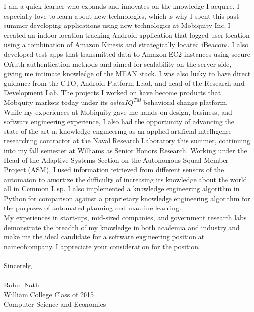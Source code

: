\documentclass[11pt]{letter} %
\newcommand{\forceindent}{\leavevmode{\parindent=24pt\indent}}
\begin{document}
\forceindent I am a quick learner who expands and innovates on the knowledge I acquire. I especially love to learn about new technologies, which is why I spent this past summer developing applications using new technologies at Mobiquity Inc. I created an indoor location tracking Android application that logged user location using a combination of Amazon Kinesis and strategically located iBeacons. I also developed test apps that transmitted data to Amazon EC2 instances using secure OAuth authentication methods and aimed for scalability on the server side, giving me intimate knowledge of the MEAN stack. I was also lucky to have direct guidance from the CTO, Android Platform Lead, and head of the Research and Development Lab. The projects I worked on have become products that Mobquity markets today under its $deltaIQ^{TM}$ behavioral change platform. \\

\forceindent While my experiences at Mobiquity gave me hands-on design, business, and software engineering experience, I also had the opportunity of advancing the state-of-the-art in knowledge engineering as an applied artificial intelligence researching contractor at the Naval Research Laboratory this summer, continuing into my fall semester at Williams as Senior Honors Research. Working under the Head of the Adaptive Systems Section on the Autonomous Squad Member Project (ASM), I used information retrieved from different sensors of the automaton to amortize the difficulty of increasing its knowledge about the world, all in Common Lisp. I also implemented a knowledge engineering algorithm in Python for comparison against a proprietary knowledge engineering algorithm for the purposes of automated planning and machine learning. \\

\forceindent My experiences in start-ups, mid-sized companies, and government research labs demonstrate the breadth of my knowledge in both academia and industry and make me the ideal candidate for a software engineering position at nameofcompany. I appreciate your consideration for the position. \\ \\

Sincerely, \\ \\
Rahul Nath \\
William College Class of 2015  \\
Computer Science and Economics \\



\end{document}
